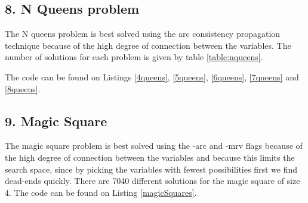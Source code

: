 \documentclass{article}
\begin{document}
\subsection*{8. N Queens problem}
The N queens problem is best solved using the arc consistency propagation technique because of the high degree of connection between the variables. The number of solutions for each problem is given by table \ref{table:nqueens}.

\begin{table}[h]
\end{table}

The code can be found on Listings \ref{4queens}, \ref{5queens}, \ref{6queens}, \ref{7queens} and \ref{8queens}.







\subsection*{9. Magic Square}
The magic square problem is best solved using the -arc and -mrv flags because of the high degree of connection between the variables and because this limits the search space, since by picking the variables with fewest possibilities first we find dead-ends quickly. There are 7040 different solutions for the magic square of size 4. The code can be found on Listing \ref{magicSquares}.


\end{document}
